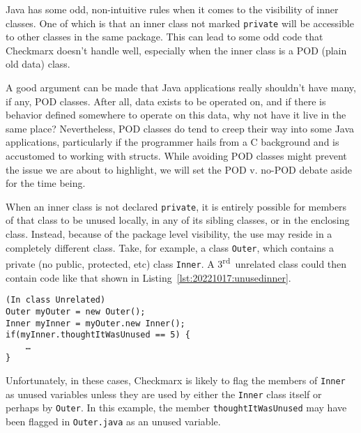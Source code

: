 Java has some odd, non-intuitive rules when it comes to the visibility of inner classes. One of which is that an inner class not marked \texttt{private} will be accessible to other classes in the same package. This can lead to some odd code that Checkmarx doesn't handle well, especially when the inner class is a POD (plain old data) class.

A good argument can be made that Java applications really shouldn't have many, if any, POD classes. After all, data exists to be operated on, and if there is behavior defined somewhere to operate on this data, why not have it live in the same place? Nevertheless, POD classes do tend to creep their way into some Java applications, particularly if the programmer hails from a C background and is accustomed to working with structs. While avoiding POD classes might prevent the issue we are about to highlight, we will set the POD v. no-POD debate aside for the time being.

When an inner class is not declared \texttt{private}, it is entirely possible for members of that class to be unused locally, in any of its sibling classes, or in the enclosing class. Instead, because of the package level visibility, the use may reside in a completely different class. Take, for example, a class \texttt{Outer}, which contains a private (no public, protected, etc) class \texttt{Inner}. A 3\textsuperscript{rd}\ unrelated class could then contain code like that shown in Listing~\ref{lst:20221017:unusedinner}.

\begin{lstlisting}[caption={Tertiary Class with Unused Inner Variables},captionpos=b,style=JavaStyle,label={lst:20221017:unusedinner}]
(In class Unrelated)
Outer myOuter = new Outer();
Inner myInner = myOuter.new Inner();
if(myInner.thoughtItWasUnused == 5) {
	…
}
\end{lstlisting}

Unfortunately, in these cases, Checkmarx is likely to flag the members of \texttt{Inner} as unused variables unless they are used by either the \texttt{Inner} class itself or perhaps by \texttt{Outer}. In this example, the member \texttt{thoughtItWasUnused} may have been flagged in \texttt{Outer.java} as an unused variable.
